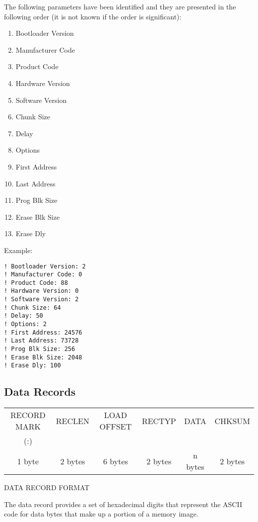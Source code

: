 The following parameters have been identified and they are presented in the following order (it is not known if the order is significant):

\begin{enumerate}
\item Bootloader Version
\item Manufacturer Code
\item Product Code
\item Hardware Version
\item Software Version
\item Chunk Size
\item Delay
\item Options
\item First Address
\item Last Address
\item Prog Blk Size
\item Erase Blk Size
\item Erase Dly
\end{enumerate}

Example:

\begin{verbatim}
! Bootloader Version: 2
! Manufacturer Code: 0
! Product Code: 88
! Hardware Version: 0
! Software Version: 2
! Chunk Size: 64
! Delay: 50
! Options: 2
! First Address: 24576
! Last Address: 73728
! Prog Blk Size: 256
! Erase Blk Size: 2048
! Erase Dly: 100
\end{verbatim}

\subsection{Data Records}

\begin{center}
\begin{tabular}{| c | c | c | c | c | c |}
\hline
RECORD MARK & RECLEN & LOAD OFFSET & RECTYP & DATA & CHKSUM \\
(:) &  &  &  &  &  \\
\hline
1 byte & 2 bytes & 6 bytes & 2 bytes & n bytes & 2 bytes \\
\hline
\end{tabular}

DATA RECORD FORMAT
\end{center}

The data record provides a set of hexadecimal digits that represent the ASCII code for data bytes that make up a portion of a memory image. 

